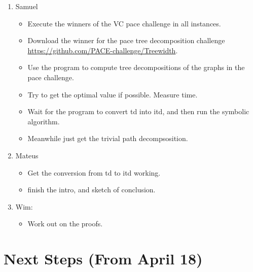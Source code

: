 \begin{enumerate}
\item Samuel
\begin{itemize}
    \item Execute the winners of the VC pace challenge in all instances. 
    \item Download the winner for the pace tree decomposition challenge \url{https://github.com/PACE-challenge/Treewidth}. 
    \item Use the program to compute tree decompositions of the graphs in the pace challenge.
    \item Try to get the optimal value if possible. Measure time. 
    \item Wait for the program to convert td into itd, and then run the symbolic algorithm. 
    \item Meanwhile just get the trivial path decompsosition. 
\end{itemize}
\item Mateus
\begin{itemize}
\item Get the conversion from td to itd working.
\item finish the intro, and sketch of conclusion.
\end{itemize}
\item Wim: 
\begin{itemize}
\item Work out on the proofs. 
\end{itemize}
\end{enumerate}

\section{Next Steps (From April 18)}

